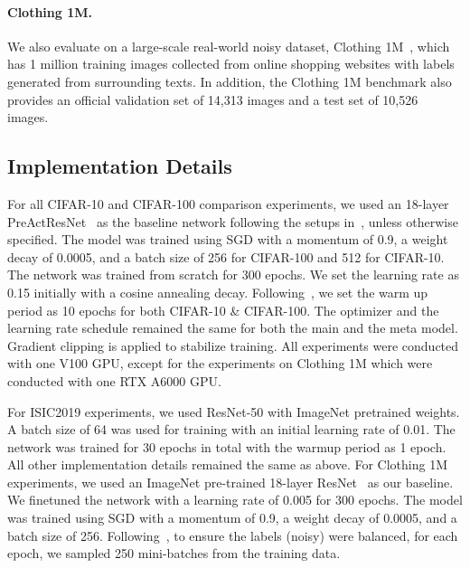 \documentclass{article}
\begin{document}
\paragraph{Clothing 1M.} We also evaluate on a large-scale real-world noisy dataset, Clothing 1M~\cite{xiao2015learning}, which has 1 million training images collected from online shopping websites with labels generated
from surrounding texts.
In addition, the Clothing 1M benchmark also provides an official validation set of 14,313  images and a test set of
10,526 images.

   

\subsection{Implementation Details}
For all CIFAR-10 and CIFAR-100 comparison experiments, we used an 18-layer PreActResNet~\cite{he2016identity} as the baseline network following the setups in~\cite{li2020dividemix}, unless otherwise specified.
The model was trained using SGD with a momentum of
0.9, a weight decay of 0.0005, and a batch size of 256 for CIFAR-100 and 512 for CIFAR-10. 
The network was trained from scratch for 300 epochs. We
set the learning rate as 0.15 initially with a cosine annealing decay. Following~\cite{li2020dividemix}, we set the warm up
period as 10 epochs for both CIFAR-10 \& CIFAR-100. 
The optimizer and the learning rate schedule remained the same for both the main and the meta model. 
Gradient clipping is applied to stabilize training.
All experiments were conducted with one V100 GPU, except for the experiments on Clothing 1M which were conducted with one RTX A6000 GPU.

For ISIC2019 experiments, we used ResNet-50 with ImageNet pretrained weights. A batch size of 64 was used for training with an initial learning rate of 0.01. The network was trained for 30 epochs in total with the warmup period as 1 epoch.
All other implementation details remained the same as above.
For Clothing 1M experiments, we used an ImageNet pre-trained 18-layer ResNet~\cite{he2016identity} as our baseline. We finetuned the network with a learning rate of 0.005 for 300 epochs. The model was trained using SGD with a momentum of 0.9, a weight decay of 0.0005, and a batch size of 256. Following~\cite{li2020dividemix}, to ensure the labels (noisy) were balanced, for each epoch, we sampled 250 mini-batches from the training data. 
\end{document}
